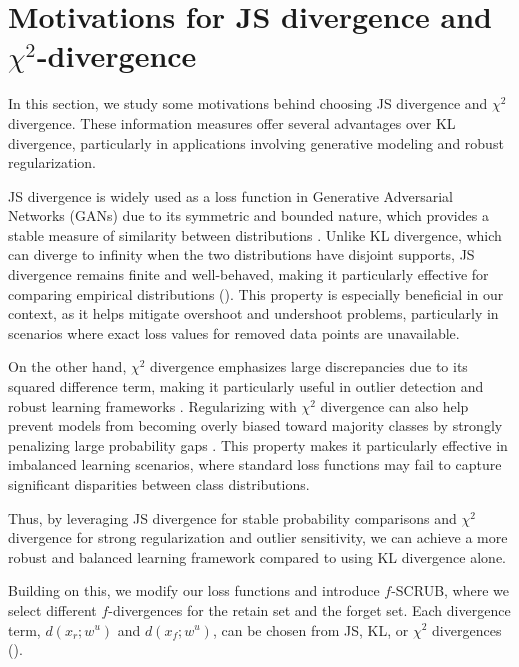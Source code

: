 \documentclass{article}
\begin{document}
\section{Motivations for JS divergence and \texorpdfstring{$\chi^2$}{chi-square}-divergence}
\label{appendix:A}
In this section, we study some motivations behind choosing JS divergence and $\chi^2$ divergence. These information measures offer several advantages over KL divergence, particularly in applications involving generative modeling and robust regularization.

JS divergence is widely used as a loss function in Generative Adversarial Networks (GANs) due to its symmetric and bounded nature, which provides a stable measure of similarity between distributions \citep{goodfellow2014generativeadversarialnetworks}. Unlike KL divergence, which can diverge to infinity when the two distributions have disjoint supports, JS divergence remains finite and well-behaved, making it particularly effective for comparing empirical distributions (\citep{nowozin2016fgantraininggenerativeneural}). This property is especially beneficial in our context, as it helps mitigate overshoot and undershoot problems, particularly in scenarios where exact loss values for removed data points are unavailable.

On the other hand, $\chi^2$ divergence emphasizes large discrepancies due to its squared difference term, making it particularly useful in outlier detection and robust learning frameworks \citep{reid2009informationdivergenceriskbinary}. Regularizing with $\chi^2$ divergence can also help prevent models from becoming overly biased toward majority classes by strongly penalizing large probability gaps \citep{duchi2020learningmodelsuniformperformance}. This property makes it particularly effective in imbalanced learning scenarios, where standard loss functions may fail to capture significant disparities between class distributions.

Thus, by leveraging JS divergence for stable probability comparisons and $\chi^2$ divergence for strong regularization and outlier sensitivity, we can achieve a more robust and balanced learning framework compared to using KL divergence alone.

Building on this, we modify our loss functions and introduce $f$-SCRUB, where we select different $f$-divergences for the retain set and the forget set. Each divergence term, $d(x_r; w^u)$ and $d(x_f; w^u)$, can be chosen from JS, KL, or $\chi^2$ divergences (\citep{Nguyen_2010}).
\end{document}
